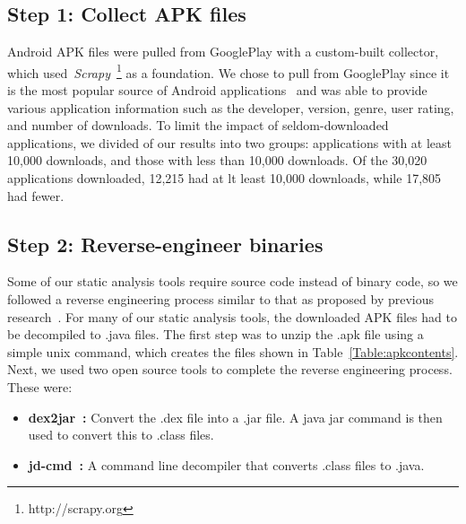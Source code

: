 \documentclass[conference]{IEEEtran}
\newcommand{\dan}[1]{\textcolor{blue}{{\it [Dan says: #1]}}}
\begin{document}
\subsection{Step 1: Collect APK files}

Android APK files were pulled from GooglePlay with a custom-built collector, which used~\emph{Scrapy}~\footnote{http://scrapy.org} as a foundation. We chose to pull from GooglePlay since it is the most popular source of Android applications~\cite{listofstores_URL} and was able to provide various application information such as the developer, version, genre, user rating, and number of downloads. To limit the impact of seldom-downloaded applications, we divided of our results into two groups: applications with at least 10,000 downloads, and those with less than 10,000 downloads. Of the 30,020 applications downloaded, 12,215 had at lt least 10,000 downloads, while 17,805 had fewer.


\subsection{Step 2: Reverse-engineer binaries}
\label{sec: decompliation}

Some of our static analysis tools require source code instead of binary code, so we followed a reverse engineering process similar to that as proposed by previous research~\cite{Lee_2013,6687155}. For many of our static analysis tools, the downloaded APK files had to be decompiled to .java files. The first step was to unzip the .apk file using a simple unix command, which creates the files shown in Table~\ref{Table:apkcontents}. Next, we used two open source tools to complete the reverse engineering process. These were:

\begin{itemize}
  \item \textbf{dex2jar~\cite{dex2jar_key}:} Convert the .dex file into a .jar file. A java jar command is then used to convert this to .class files.
  \item \textbf{jd-cmd~\cite{jdcmd_key}:} A command line decompiler that converts .class files to .java.
\end{itemize}
\end{document}
